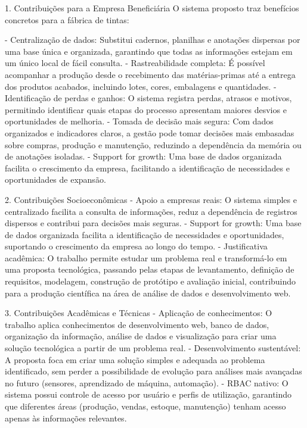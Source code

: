 \documentclass[12pt,a4paper]{article}
\begin{document}
1. Contribuições para a Empresa Beneficiária
O sistema proposto traz benefícios concretos para a fábrica de tintas:

- Centralização de dados: Substitui cadernos, planilhas e anotações dispersas por uma base única e organizada, garantindo que todas as informações estejam em um único local de fácil consulta.
- Rastreabilidade completa: É possível acompanhar a produção desde o recebimento das matérias-primas até a entrega dos produtos acabados, incluindo lotes, cores, embalagens e quantidades.
- Identificação de perdas e ganhos: O sistema registra perdas, atrasos e motivos, permitindo identificar quais etapas do processo apresentam maiores desvios e oportunidades de melhoria.
- Tomada de decisão mais segura: Com dados organizados e indicadores claros, a gestão pode tomar decisões mais embasadas sobre compras, produção e manutenção, reduzindo a dependência da memória ou de anotações isoladas.
- Support for growth: Uma base de dados organizada facilita o crescimento da empresa, facilitando a identificação de necessidades e oportunidades de expansão.

2. Contribuições Socioeconômicas
- Apoio a empresas reais: O sistema simples e centralizado facilita a consulta de informações, reduz a dependência de registros dispersos e contribui para decisões mais seguras.
- Support for growth: Uma base de dados organizada facilita a identificação de necessidades e oportunidades, suportando o crescimento da empresa ao longo do tempo.
- Justificativa acadêmica: O trabalho permite estudar um problema real e transformá-lo em uma proposta tecnológica, passando pelas etapas de levantamento, definição de requisitos, modelagem, construção de protótipo e avaliação inicial, contribuindo para a produção científica na área de análise de dados e desenvolvimento web.

3. Contribuições Acadêmicas e Técnicas
- Aplicação de conhecimentos: O trabalho aplica conhecimentos de desenvolvimento web, banco de dados, organização da informação, análise de dados e visualização para criar uma solução tecnológica a partir de um problema real.
- Desenvolvimento sustentável: A proposta foca em criar uma solução simples e adequada ao problema identificado, sem perder a possibilidade de evolução para análises mais avançadas no futuro (sensores, aprendizado de máquina, automação).
- RBAC nativo: O sistema possui controle de acesso por usuário e perfis de utilização, garantindo que diferentes áreas (produção, vendas, estoque, manutenção) tenham acesso apenas às informações relevantes.
\end{document}
